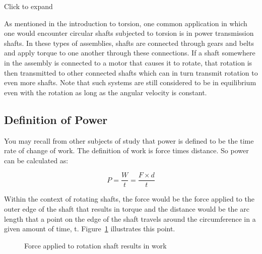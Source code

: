 \documentclass[
  letterpaper,
  DIV=11,
  numbers=noendperiod]{scrreprt}
\theoremstyle{definition}
\theoremstyle{remark}
\begin{document}
Click to expand

As mentioned in the introduction to torsion, one common application in
which one would encounter circular shafts subjected to torsion is in
power transmission shafts. In these types of assemblies, shafts are
connected through gears and belts and apply torque to one another
through these connections. If a shaft somewhere in the assembly is
connected to a motor that causes it to rotate, that rotation is then
transmitted to other connected shafts which can in turn transmit
rotation to even more shafts. Note that such systems are still
considered to be in equilibrium even with the rotation as long as the
angular velocity is constant.

\subsection{Definition of Power}\label{definition-of-power}

You may recall from other subjects of study that power is defined to be
the time rate of change of work. The definition of work is force times
distance. So power can be calculated as:

\[
P=\frac{W}{t}=\frac{F \times d}{t}
\]

Within the context of rotating shafts, the force would be the force
applied to the outer edge of the shaft that results in torque and the
distance would be the arc length that a point on the edge of the shaft
travels around the circumference in a given amount of time, t.
Figure~\ref{fig-6.14} illustrates this point.

\begin{figure}


\caption{\label{fig-6.14}Force applied to rotation shaft results in
work}

\end{figure}%
\end{document}
